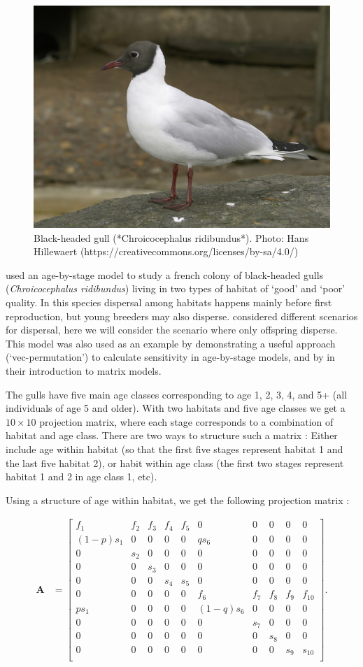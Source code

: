 \documentclass[
]{book}
\begin{document}
\begin{figure}
\includegraphics[width=0.6\linewidth]{BlackHeadedGull} \caption{Black-headed gull (*Chroicocephalus ridibundus*). Photo: Hans Hillewaert (https://creativecommons.org/licenses/by-sa/4.0/)}\label{fig:BlackHeadedGull}
\end{figure}

\citet{Lebreton2} used an age-by-stage model to study a french colony of black-headed gulls (\emph{Chroicocephalus ridibundus}) living in two types of habitat of `good' and `poor' quality. In this species dispersal among habitats happens mainly before first reproduction, but young breeders may also disperse. \citet{Lebreton2} considered different scenarios for dispersal, here we will consider the scenario where only offspring disperse. This model was also used as an example by \citet{Hunter2} demonstrating a useful approach (`vec-permutation') to calculate sensitivity in age-by-stage models, and by \citet{Vindenes2020} in their introduction to matrix models.

The gulls have five main age classes corresponding to age 1, 2, 3, 4, and 5+ (all individuals of age 5 and older). With two habitats and five age classes we get a \(10\times 10\) projection matrix, where each stage corresponds to a combination of habitat and age class. There are two ways to structure such a matrix \citep{Lebreton2}: Either include age within habitat (so that the first five stages represent habitat 1 and the last five habitat 2), or habit within age class (the first two stages represent habitat 1 and 2 in age class 1, etc).

Using a structure of age within habitat, we get the following projection matrix \citep{Vindenes2020}:

\begin{align}\label{AGulls}
\mathbf{A}
&=\left[\begin{array}{ccccc|ccccc}
f_1&f_2&f_3&f_4&f_5 &0&0&0&0&0 \\
(1-p)s_1&0&0&0&0&qs_6&0&0&0&0\\
0&s_2&0&0&0&0&0&0&0&0\\
0&0&s_3&0&0&0&0&0&0&0\\
0&0&0&s_4&s_5&0&0&0&0&0\\
\hline
0&0&0&0&0&f_6&f_7&f_8&f_9&f_{10}\\
ps_1&0&0&0&0&(1-q)s_6&0&0&0&0\\
0&0&0&0&0&0&s_7&0&0&0\\
0&0&0&0&0&0&0&s_8&0&0\\
0&0&0&0&0&0&0&0&s_9&s_{10}\\
\end{array}\right].
\end{align}
\end{document}
